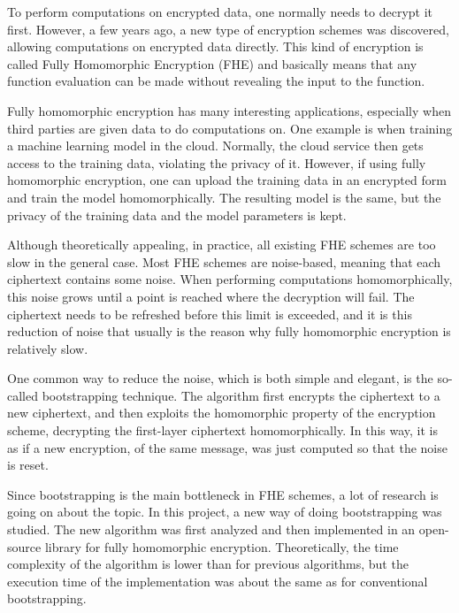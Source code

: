 
To perform computations on encrypted data, one normally needs to decrypt it first. However, a few years ago, a new type of encryption schemes was discovered, allowing computations on encrypted data directly. This kind of encryption is called Fully Homomorphic Encryption (FHE) and basically means that any function evaluation can be made without revealing the input to the function.

Fully homomorphic encryption has many interesting applications, especially when third parties are given data to do computations on. One example is when training a machine learning model in the cloud. Normally, the cloud service then gets access to the training data, violating the privacy of it. However, if using fully homomorphic encryption, one can upload the training data in an encrypted form and train the model homomorphically. The resulting model is the same, but the privacy of the training data and the model parameters is kept.

Although theoretically appealing, in practice, all existing FHE schemes are too slow in the general case. Most FHE schemes are noise-based, meaning that each ciphertext contains some noise. When performing computations homomorphically, this noise grows until a point is reached where the decryption will fail. The ciphertext needs to be refreshed before this limit is exceeded, and it is this reduction of noise that usually is the reason why fully homomorphic encryption is relatively slow.

One common way to reduce the noise, which is both simple and elegant, is the so-called bootstrapping technique. The algorithm first encrypts the ciphertext to a new ciphertext, and then exploits the homomorphic property of the encryption scheme, decrypting the first-layer ciphertext homomorphically. In this way, it is as if a new encryption, of the same message, was just computed so that the noise is reset.

Since bootstrapping is the main bottleneck in FHE schemes, a lot of research is going on about the topic. In this project, a new way of doing bootstrapping was studied. The new algorithm was first analyzed and then implemented in an open-source library for fully homomorphic encryption. Theoretically, the time complexity of the algorithm is lower than for previous algorithms, but the execution time of the implementation was about the same as for conventional bootstrapping.